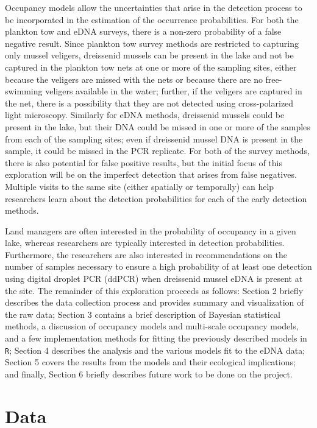 \documentclass[12pt]{article}\usepackage[]{graphicx}\usepackage[]{color}
\begin{document}
Occupancy models allow the uncertainties that arise in the detection process to be incorporated in the estimation of the occurrence probabilities. For both the plankton tow and eDNA surveys, there is a non-zero probability of a false negative result. Since plankton tow survey methods are restricted to capturing only mussel veligers, dreissenid mussels can be present in the lake and not be captured in the plankton tow nets at one or more of the sampling sites, either because the veligers are missed with the nets or because there are no free-swimming veligers available in the water; further, if the veligers are captured in the net, there is a possibility that they are not detected using cross-polarized light microscopy. Similarly for eDNA methods, dreissenid mussels could be present in the lake, but their DNA could be missed in one or more of the samples from each of the sampling sites; even if dreissenid mussel DNA is present in the sample, it could be missed in the PCR replicate. For both of the survey methods, there is also potential for false positive results, but the initial focus of this exploration will be on the imperfect detection that arises from false negatives. Multiple visits to the same site (either spatially or temporally) can help researchers learn about the detection probabilities for each of the early detection methods. 

Land managers are often interested in the probability of occupancy in a given lake, whereas researchers are typically interested in detection probabilities. Furthermore, the researchers are also interested in recommendations on the number of samples necessary to ensure a high probability of at least one detection using digital droplet PCR (ddPCR) when dreissenid mussel eDNA is present at the site. The remainder of this exploration proceeds as follows: Section 2 briefly describes the data collection process and provides summary and visualization of the raw data; Section 3 contains a brief description of Bayesian statistical methods, a discussion of occupancy models and multi-scale occupancy models, and a few implementation methods for fitting the previously described models in \texttt{R}; Section 4 describes the analysis and the various models fit to the eDNA data; Section 5 covers the results from the models and their ecological implications; and finally, Section 6 briefly describes future work to be done on the project.

\section{Data}
\end{document}
